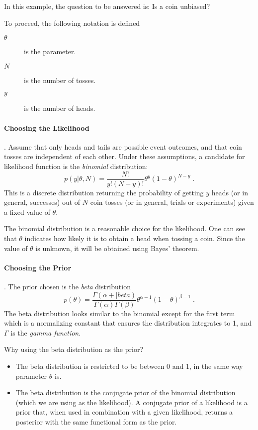 \begin{example}
    In this example, the question to be answered is: Is a coin unbiased? 

    To proceed, the following notation is defined
    \begin{description}
        \item[$\theta$] is the parameter.
        \item[$N$] is the number of tosses.
        \item[$y$] is the number of heads. 
    \end{description}

    \paragraph{Choosing the Likelihood}. Assume that only heads and tails are possible event outcomes, and that coin tosses are independent of each other. Under these assumptions, a candidate for likelihood function is the \emph{binomial} distribution:
    \begin{equation}
        p(y|\theta, N)=\dfrac{N!}{y!(N-y)!}\theta^y(1-\theta)^{N-y}\;.
    \end{equation}
    This is a discrete distribution returning the probability of getting $y$ heads 
    (or in general, successes) out of $N$ coin tosses (or in general, trials or experiments) 
    given a fixed value of $\theta$.

    The binomial distribution is a reasonable choice for the likelihood. One can see that $\theta$
    indicates how likely it is to obtain a head when tossing a coin. Since the value of $\theta$ is
    unknown, it will be obtained using Bayes' theorem.

    \paragraph{Choosing the Prior}. The prior chosen is the \emph{beta} distribution
    \begin{equation}
        p(\theta)=\dfrac{\Gamma(\alpha+|beta)}{\Gamma(\alpha)\Gamma(\beta)}\theta^{\alpha-1}(1-\theta)^{\beta-1}\;.
    \end{equation}
    The beta distribution looks similar to the binomial except for the first term which is a normalizing constant that ensures the distribution integrates to 1, and $\Gamma$ is the \emph{gamma function}.

    Why using the beta distribution as the prior? 
    \begin{itemize}
        \item The beta distribution is restricted to be between 0 and 1, in the same way parameter $\theta$ is. 
        \item The beta distribution is the conjugate prior of the binomial distribution (which we are using as the likelihood). A conjugate prior of a likelihood is a prior that, when used in combination with a given likelihood, returns a posterior with the same functional form as the prior.
    \end{itemize}
    

\end{example}
